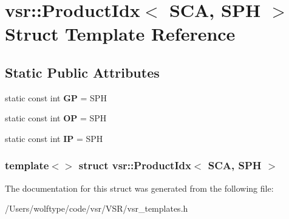 \hypertarget{structvsr_1_1_product_idx_3_01_s_c_a_00_01_s_p_h_01_4}{\section{vsr\-:\-:Product\-Idx$<$ S\-C\-A, S\-P\-H $>$ Struct Template Reference}
\label{structvsr_1_1_product_idx_3_01_s_c_a_00_01_s_p_h_01_4}
}
\subsection*{Static Public Attributes}
\begin{DoxyCompactItemize}
\item 
\hypertarget{structvsr_1_1_product_idx_3_01_s_c_a_00_01_s_p_h_01_4_a78c82a55effa72be6bde1c472aa00c60}{static const int {\bfseries G\-P} = S\-P\-H}\label{structvsr_1_1_product_idx_3_01_s_c_a_00_01_s_p_h_01_4_a78c82a55effa72be6bde1c472aa00c60}

\item 
\hypertarget{structvsr_1_1_product_idx_3_01_s_c_a_00_01_s_p_h_01_4_a3d1ea7e61531049005fe3f621494b727}{static const int {\bfseries O\-P} = S\-P\-H}\label{structvsr_1_1_product_idx_3_01_s_c_a_00_01_s_p_h_01_4_a3d1ea7e61531049005fe3f621494b727}

\item 
\hypertarget{structvsr_1_1_product_idx_3_01_s_c_a_00_01_s_p_h_01_4_a6cac3c6d8df23718044bbe8be47ea450}{static const int {\bfseries I\-P} = S\-P\-H}\label{structvsr_1_1_product_idx_3_01_s_c_a_00_01_s_p_h_01_4_a6cac3c6d8df23718044bbe8be47ea450}

\end{DoxyCompactItemize}
\subsubsection*{template$<$$>$ struct vsr\-::\-Product\-Idx$<$ S\-C\-A, S\-P\-H $>$}



The documentation for this struct was generated from the following file\-:\begin{DoxyCompactItemize}
\item 
/\-Users/wolftype/code/vsr/\-V\-S\-R/vsr\-\_\-templates.\-h\end{DoxyCompactItemize}
